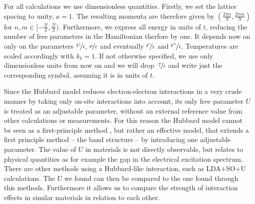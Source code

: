 \documentclass[a4paper,12pt]{report}
\begin{document}
For all calculations we use dimensionless quantities. 
Firstly, we set the lattice spacing to unity, $a=1$. 
The resulting momenta are therefore given by $(\frac{2\pi n}{N},\frac{2\pi m}{N})$ for $n,m \in [-\frac N2, \frac N2)$.
Furthermore, we express all energy in units of $t$, reducing the number of free parameters in the Hamiltonian therfore by one.
It depends now on only on the parameters $\nicefrac Ut$, $\nicefrac {\mu}t$ and eventually $\nicefrac{t^{\prime}}t$ and $\nicefrac{t^{\prime \prime}}t$.
Temperatures are scaled accordingly with $k_b=1$.
If not otherwise specified, we use only dimensionless units from now on and we will drop $\nicefrac{\cdot7}{t}$ and write just the corresponding symbol, 
assuming it is in units of $t$.


Since the Hubbard model reduces electron-electron interactions in a very crude manner by taking only on-site interactions into account,
its only free parameter $U$ is treated as an adjustable parameter, without an external reference value from other calculations or measurements.	
For this reason the Hubbard model cannot be seen as a first-principle method \cite{J.Phys.Cond.Matter.Vol21.34},
but rather an effective model, that extends a first principle method – the band structure – by introducing one adjustable parameter.
The value of $U$ in materials is not directly observable, but relates to physical quantities as for example the gap in the electrical excitation spectrum.
There are other methods using a Hubbard-like interaction, such as LDA+SO+U calculations.
The $U$ we found can then be compared to the one found through this methods. 
Furthermore it allows us to compare the strength of interaction effects in similar materials in relation to each other.
\end{document}
